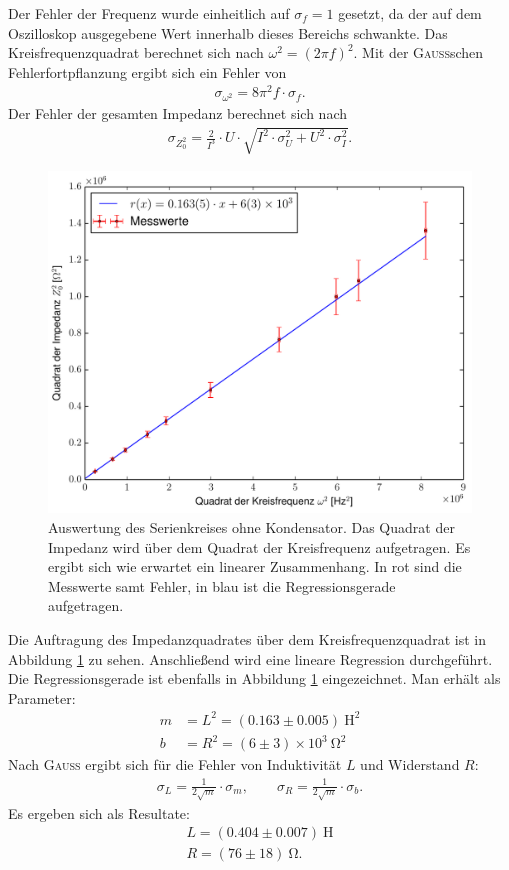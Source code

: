 \documentclass[12pt,a4paper,titlepage,headinclude]{scrartcl}
\numberwithin{equation}{section}
\newcommand{\mrm}[1]{\mathrm{#1}}
\newcommand{\person}[1]{\textsc{#1}}
\begin{document}
Der Fehler der Frequenz wurde einheitlich auf $\sigma_f=1$ gesetzt, da der auf dem Oszilloskop ausgegebene Wert innerhalb dieses Bereichs schwankte. Das Kreisfrequenzquadrat berechnet sich nach $\omega^2=\left( 2\pi f \right)^2$. Mit der \person{Gauss}schen Fehlerfortpflanzung ergibt sich ein Fehler von 
\begin{align}
	\sigma_{\omega^2}=8  \pi^{2}  f\cdot \sigma_{f}.
	\label{eq:sigmaomega}
\end{align}
 Der Fehler der gesamten Impedanz berechnet sich nach
\begin{align}
	\sigma_{Z_0^2}=\frac{2}{I^{3}} \cdot U \cdot \sqrt{I^{2} \cdot \sigma_{U}^{2} + U^{2} \cdot \sigma_{I}^{2}}.
	\label{eq:sigmaz0}
\end{align}
\begin{figure}[h!]
	\centering
	\includegraphics[width=\textwidth]{plot1.pdf}
	\caption{Auswertung des Serienkreises ohne Kondensator. Das Quadrat der Impedanz wird über dem Quadrat der Kreisfrequenz aufgetragen. Es ergibt sich wie erwartet ein linearer Zusammenhang. In rot sind die Messwerte samt Fehler, in blau ist die Regressionsgerade aufgetragen.}
	\label{fig:plot1}
\end{figure}

Die Auftragung des Impedanzquadrates über dem Kreisfrequenzquadrat ist in Abbildung \ref{fig:plot1} zu sehen. Anschließend wird eine lineare Regression durchgeführt. Die Regressionsgerade ist ebenfalls in Abbildung \ref{fig:plot1} eingezeichnet. Man erhält als Parameter:
\begin{align}
	m&=L^2=(0.163\pm0.005)~\mrm{H}^2\\
	b&=R^2=(6\pm3)\times 10^3~\mrm{\Omega}^2
	\label{eq:plot1}
\end{align}
Nach \person{Gauss} ergibt sich für die Fehler von Induktivität $L$ und Widerstand $R$:
\begin{align}
	\sigma_L=\frac{1}{2\sqrt{m}}\cdot\sigma_m,\qquad\sigma_R=\frac{1}{2\sqrt{m}}\cdot\sigma_b.
	\label{eq:sigma1}
\end{align}
Es ergeben sich als Resultate:
\begin{align}
	L=(0.404\pm0.007)~\mrm{H}\\
	R=(76\pm18)~\mrm{\Omega}.
	\label{eq:result1}
\end{align}
\end{document}
